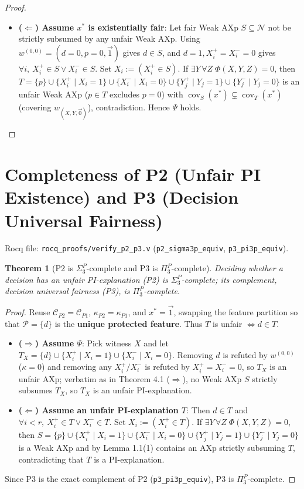\documentclass[11pt,a4paper]{article}
\newtheorem{theorem}{Theorem}[section]
\newcommand{\C}{\mathcal{C}}
\newcommand{\N}{\mathcal{N}}
\newcommand{\Prot}{\mathcal{P}}
\newcommand{\cov}{\operatorname{cov}}
\newcommand{\code}[1]{\texttt{\small #1}}
\begin{document}
\begin{proof}
\begin{itemize}
\begin{itemize}
  \end{itemize}
  \item \textbf{($\Leftarrow$) Assume $x^*$ is existentially fair}: Let fair Weak AXp $S \subseteq \N$ not be strictly subsumed by any unfair Weak AXp. Using $w^{(0,0)}=(d=0,p=0,\vec{1})$ gives $d \in S$, and $d=1, X_i^+=X_i^-=0$ gives $\forall i,\ X_i^+ \in S \lor X_i^- \in S$. Set $X_i := (X_i^+ \in S)$. If $\exists Y\,\forall Z\;\Phi(X,Y,Z)=0$, then $T = \{p\} \cup \{X_i^+ \mid X_i=1\} \cup \{X_i^- \mid X_i=0\} \cup \{Y_j^+ \mid Y_j=1\} \cup \{Y_j^- \mid Y_j=0\}$ is an unfair Weak AXp ($p \in T$ excludes $p=0$) with $\cov_S(x^*) \subsetneq \cov_T(x^*)$ (covering $w_{(X,Y,\vec{0})}$), contradiction. Hence $\Psi$ holds.
\end{itemize}
\end{proof}

\section{Completeness of P2 (Unfair PI Existence) and P3 (Decision Universal Fairness)}
Rocq file: \code{rocq\_proofs/verify\_p2\_p3.v} (\code{p2\_sigma3p\_equiv}, \code{p3\_pi3p\_equiv}).

\begin{theorem}[P2 is $\Sigma_3^P$-complete and P3 is $\Pi_3^P$-complete]
Deciding whether a decision has an unfair PI-explanation (P2) is $\Sigma_3^P$-complete; its complement, decision universal fairness (P3), is $\Pi_3^P$-complete.
\end{theorem}
\begin{proof}
Reuse $\C_{P2}=\C_{P1}$, $\kappa_{P2}=\kappa_{P1}$, and $x^*=\vec{1}$, swapping the feature partition so that $\Prot = \{d\}$ is the \textbf{unique protected feature}. Thus $T$ is unfair $\iff d \in T$.
\begin{itemize}
  \item \textbf{($\Rightarrow$) Assume $\Psi$}: Pick witness $X$ and let $T_X = \{d\} \cup \{X_i^+ \mid X_i=1\} \cup \{X_i^- \mid X_i=0\}$. Removing $d$ is refuted by $w^{(0,0)}$ ($\kappa=0$) and removing any $X_i^+/X_i^-$ is refuted by $X_i^+=X_i^-=0$, so $T_X$ is an unfair AXp; verbatim as in Theorem 4.1 ($\Rightarrow$), no Weak AXp $S$ strictly subsumes $T_X$, so $T_X$ is an unfair PI-explanation.
  \item \textbf{($\Leftarrow$) Assume an unfair PI-explanation $T$}: Then $d \in T$ and $\forall i<r,\ X_i^+ \in T \lor X_i^- \in T$. Set $X_i := (X_i^+ \in T)$. If $\exists Y\,\forall Z\;\Phi(X,Y,Z)=0$, then $S = \{p\} \cup \{X_i^+ \mid X_i=1\} \cup \{X_i^- \mid X_i=0\} \cup \{Y_j^+ \mid Y_j=1\} \cup \{Y_j^- \mid Y_j=0\}$ is a Weak AXp and by Lemma 1.1(1) contains an AXp strictly subsuming $T$, contradicting that $T$ is a PI-explanation.
\end{itemize}
Since P3 is the exact complement of P2 (\code{p3\_pi3p\_equiv}), P3 is $\Pi_3^P$-complete.
\end{proof}
\end{document}
